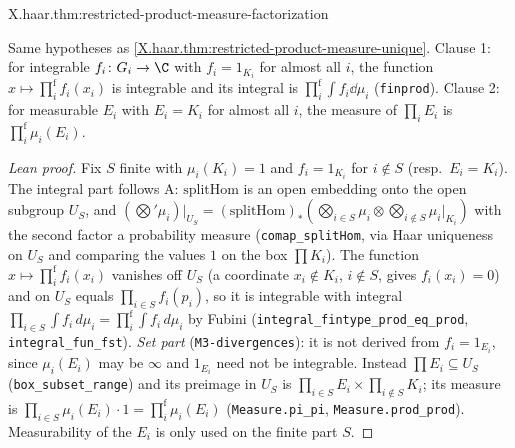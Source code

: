 \begin{tfformal}{X.haar.thm:restricted-product-measure-factorization}
\begin{tffidelity}
Same hypotheses as \cref{X.haar.thm:restricted-product-measure-unique}. Clause 1: for integrable $f_i\colon G_i\to\C$ with $f_i=1_{K_i}$ for almost all $i$, the function $x\mapsto\prod^{\mathrm f}_if_i(x_i)$ is integrable and its integral is $\prod^{\mathrm f}_i\int f_i\dd\mu_i$ (\texttt{finprod}). Clause 2: for measurable $E_i$ with $E_i=K_i$ for almost all $i$, the measure of $\prod_iE_i$ is $\prod^{\mathrm f}_i\mu_i(E_i)$.
\end{tffidelity}
\end{tfformal}
\begin{proof}[Lean proof]
Fix $S$ finite with $\mu_i(K_i)=1$ and $f_i=1_{K_i}$ for $i\notin S$ (resp.\ $E_i=K_i$). The integral part follows A: $\mathrm{splitHom}$ is an open embedding onto the open subgroup $U_S$, and $(\bigotimes'\mu_i)|_{U_S}=(\mathrm{splitHom})_*(\bigotimes_{i\in S}\mu_i\otimes\bigotimes_{i\notin S}\mu_i|_{K_i})$ with the second factor a probability measure (\texttt{comap\_splitHom}, via Haar uniqueness on $U_S$ and comparing the values $1$ on the box $\prod K_i$). The function $x\mapsto\prod^{\mathrm f}_if_i(x_i)$ vanishes off $U_S$ (a coordinate $x_i\notin K_i$, $i\notin S$, gives $f_i(x_i)=0$) and on $U_S$ equals $\prod_{i\in S}f_i(p_i)$, so it is integrable with integral $\prod_{i\in S}\int f_i\,d\mu_i=\prod^{\mathrm f}_i\int f_i\,d\mu_i$ by Fubini (\texttt{integral\_fintype\_prod\_eq\_prod}, \texttt{integral\_fun\_fst}). \emph{Set part} (\texttt{M3-divergences}): it is not derived from $f_i=1_{E_i}$, since $\mu_i(E_i)$ may be $\infty$ and $1_{E_i}$ need not be integrable. Instead $\prod E_i\subseteq U_S$ (\texttt{box\_subset\_range}) and its preimage in $U_S$ is $\prod_{i\in S}E_i\times\prod_{i\notin S}K_i$; its measure is $\prod_{i\in S}\mu_i(E_i)\cdot 1=\prod^{\mathrm f}_i\mu_i(E_i)$ (\texttt{Measure.pi\_pi}, \texttt{Measure.prod\_prod}). Measurability of the $E_i$ is only used on the finite part $S$.
\end{proof}


